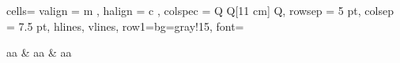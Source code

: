    \begin{longtblr}[
        caption = titulo tabla,
        label = etiqueta
        ]{
            cells={ valign = m , halign = c }, 
            colspec = {Q Q[11 cm] Q}, 
            rowsep = 5 pt,        
            colsep = 7.5 pt,           
            hlines,              
            vlines,                             
            row{1}={bg=gray!15, font=\bfseries}
        }

            aa & aa & aa \\

    \end{longtblr}
        
    